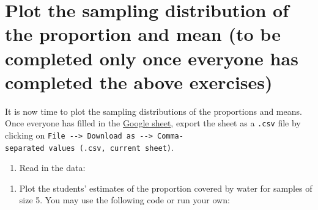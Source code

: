 \documentclass[letterpaper,10pt,twoside,]{pinp}
\providecommand{\tightlist}{%
  \setlength{\itemsep}{0pt}\setlength{\parskip}{0pt}}
\begin{document}
\newpage

\hypertarget{plot-the-sampling-distribution-of-the-proportion-and-mean-to-be-completed-only-once-everyone-has-completed-the-above-exercises}{%
\section{Plot the sampling distribution of the proportion and mean (to
be completed only once everyone has completed the above
exercises)}\label{plot-the-sampling-distribution-of-the-proportion-and-mean-to-be-completed-only-once-everyone-has-completed-the-above-exercises}}

It is now time to plot the sampling distributions of the proportions and
means. Once everyone has filled in the
\href{https://docs.google.com/spreadsheets/d/1Mnxeq9nQcTdQycZ7S_62fYFiNC5_a3fibsyodzfwO58/edit?usp=sharing}{Google
sheet}, export the sheet as a \texttt{.csv} file by clicking on
\texttt{File\ -\/-\textgreater{}\ Download\ as\ -\/-\textgreater{}\ Comma-separated\ values\ (.csv,\ current\ sheet)}.

\begin{enumerate}
\def\labelenumi{\arabic{enumi}.}
\tightlist
\item
  Read in the data:
\end{enumerate}

\begin{Shaded}
\begin{Highlighting}[]
\StringTok{ }\NormalTok{(}\NormalTok{, }\NormalTok{)}
\StringTok{ }\NormalTok{water_results[,}\OperatorTok{:}\NormalTok{]}
\StringTok{ }\NormalTok{water_results[}\NormalTok{(water_results), ]}

\StringTok{ }
\end{Highlighting}
\end{Shaded}

\begin{enumerate}
\def\labelenumi{\arabic{enumi}.}
\setcounter{enumi}{1}
\tightlist
\item
  Plot the students' estimates of the proportion covered by water for
  samples of size 5. You may use the following code or run your own:
\end{enumerate}
\end{document}
